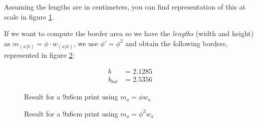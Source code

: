 \documentclass[
    paper=letter,
    parskip=half-,
    DIV=10,
]{scrartcl}
\begin{document}
Assuming the lengths are in centimeters, you can find representation of this at scale in figure \ref{fig:phi}.

If we want to compute the border area so we have the \emph{lengths} (width and height) as $m_{(x|h)} = \phi\cdot w_{(x|h)}$, we use $\phi' = \phi^2$ and obtain the following borders, represented in figure \ref{fig:phisquare}:

\begin{align*}
    b &= 2.1285 \\
    b_{bot} &= 2.5356
\end{align*}

    \begin{figure}
    \caption{Result for a 9x6cm print using $m_a = \phi w_a$}\label{fig:phi}
    \centering
{}
    \end{figure}


    \begin{figure}
    \caption{Result for a 9x6cm print using $m_a = \phi^2 w_a$}\label{fig:phisquare}
    \centering
{}
    \end{figure}
\end{document}
